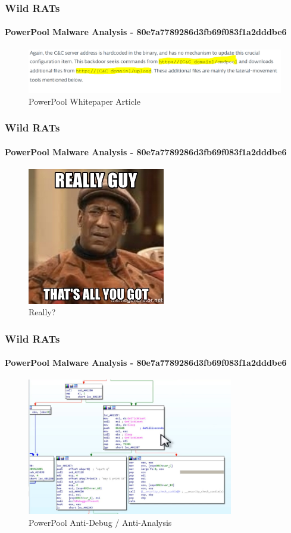\documentclass[aspectratio=169]{beamer}
\begin{document}
\begin{frame}
  \frametitle{Wild RATs}
  \framesubtitle{PowerPool Malware Analysis - 80e7a7789286d3fb69f083f1a2dddbe6}
  \begin{center}
    \begin{figure}
      \includegraphics[width=14cm,keepaspectratio]{powerpool_article}
      \caption{PowerPool Whitepaper Article}
    \end{figure}
  \end{center}
\end{frame}

\begin{frame}
  \frametitle{Wild RATs}
  \framesubtitle{PowerPool Malware Analysis - 80e7a7789286d3fb69f083f1a2dddbe6}
  \begin{center}
    \begin{figure}
      \includegraphics[width=6cm,keepaspectratio]{really_guy_all_you_got}
      \caption{Really?}
    \end{figure}
  \end{center}
\end{frame}

\begin{frame}
  \frametitle{Wild RATs}
  \framesubtitle{PowerPool Malware Analysis - 80e7a7789286d3fb69f083f1a2dddbe6}
  \begin{center}
    \begin{figure}
      \includegraphics[width=9cm,keepaspectratio]{powerpool_anti_debug}
      \caption{PowerPool Anti-Debug / Anti-Analysis}
    \end{figure}
  \end{center}
\end{frame}
\end{document}
